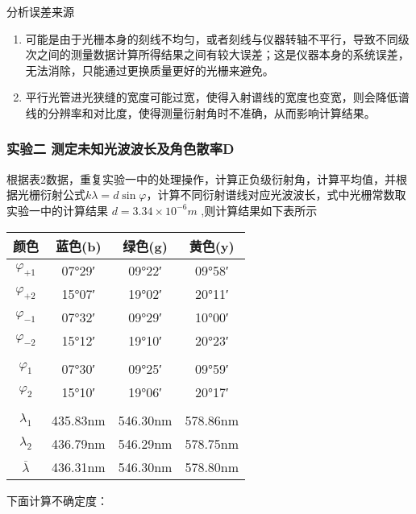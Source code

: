 \documentclass[dvipsnames, svgnames,a4paper,11pt]{article}
\begin{document}
		分析误差来源
			\begin{enumerate}
				\item 可能是由于光栅本身的刻线不均匀，或者刻线与仪器转轴不平行，导致不同级次之间的测量数据计算所得结果之间有较大误差；这是仪器本身的系统误差，无法消除，只能通过更换质量更好的光栅来避免。
				
				\item 平行光管进光狭缝的宽度可能过宽，使得入射谱线的宽度也变宽，则会降低谱线的分辨率和对比度，使得测量衍射角时不准确，从而影响计算结果。
			\end{enumerate}
		
		
		\subsubsection{实验二 测定未知光波波长及角色散率D}
			
			根据表2数据，重复实验一中的处理操作，计算正负级衍射角，计算平均值，并根据光栅衍射公式$k\lambda=d\sin{\varphi}$，计算不同衍射谱线对应光波波长，式中光栅常数取实验一中的计算结果 $d=3.34\times{10}^{-6}m$ ,则计算结果如下表所示
			
			\begin{center}
				\begin{tabular}{|c|c|c|c|}
					\hline
					\textbf{颜色} & \textbf{蓝色(b)} & \textbf{绿色(g)} & \textbf{黄色(y)} \\
					\hline
					$\varphi_{+1}$ & 07°29′ & 09°22′ & 09°58′ \\
					$\varphi_{+2}$ & 15°07′ & 19°02′ & 20°11′ \\
					$\varphi_{-1}$ & 07°32′ & 09°29′ & 10°00′ \\
					$\varphi_{-2}$ & 15°12′ & 19°10′ & 20°23′ \\
					\hline
					&  &  &  \\
					\hline
					$\varphi_1$ & 07°30′ & 09°25′ & 09°59′ \\
					$\varphi_2$ & 15°10′ & 19°06′ & 20°17′ \\
					\hline
					&  &  &  \\
					\hline
					$\lambda_1$ & 435.83nm & 546.30nm & 578.86nm \\
					$\lambda_2$ & 436.79nm & 546.29nm & 578.75nm \\
					$\overline{\lambda}$ & 436.31nm & 546.30nm & 578.80nm \\
					\hline
				\end{tabular}
			\end{center}

			下面计算不确定度：
				
\end{document}
